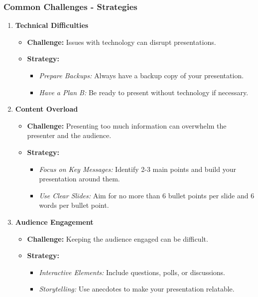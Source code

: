 \documentclass[aspectratio=169]{beamer}
\begin{document}
\begin{frame}[fragile]
    \frametitle{Common Challenges - Strategies}
    \begin{enumerate}
        \item \textbf{Technical Difficulties}
        \begin{itemize}
            \item \textbf{Challenge:} Issues with technology can disrupt presentations.
            \item \textbf{Strategy:}
            \begin{itemize}
                \item \textit{Prepare Backups:} Always have a backup copy of your presentation.
                \item \textit{Have a Plan B:} Be ready to present without technology if necessary.
            \end{itemize}
        \end{itemize}
        \item \textbf{Content Overload}
        \begin{itemize}
            \item \textbf{Challenge:} Presenting too much information can overwhelm the presenter and the audience.
            \item \textbf{Strategy:}
            \begin{itemize}
                \item \textit{Focus on Key Messages:} Identify 2-3 main points and build your presentation around them.
                \item \textit{Use Clear Slides:} Aim for no more than 6 bullet points per slide and 6 words per bullet point.
            \end{itemize}
        \end{itemize}
        \item \textbf{Audience Engagement}
        \begin{itemize}
            \item \textbf{Challenge:} Keeping the audience engaged can be difficult.
            \item \textbf{Strategy:}
            \begin{itemize}
                \item \textit{Interactive Elements:} Include questions, polls, or discussions.
                \item \textit{Storytelling:} Use anecdotes to make your presentation relatable.
            \end{itemize}
        \end{itemize}
    \end{enumerate}
\end{frame}
\end{document}
